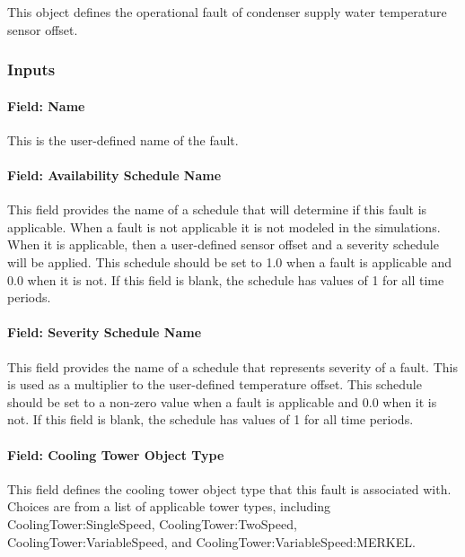 This object defines the operational fault of condenser supply water temperature sensor offset.

\subsubsection{Inputs}

\paragraph{Field: Name}

This is the user-defined name of the fault.

\paragraph{Field: Availability Schedule Name}

This field provides the name of a schedule that will determine if this fault is applicable. When a fault is not applicable it is not modeled in the simulations. When it is applicable, then a user-defined sensor offset and a severity schedule will be applied. This schedule should be set to 1.0 when a fault is applicable and 0.0 when it is not. If this field is blank, the schedule has values of 1 for all time periods.

\paragraph{Field: Severity Schedule Name}\label{field-severity-schedule-name}

This field provides the name of a schedule that represents severity of a fault. This is used as a multiplier to the user-defined temperature offset. This schedule should be set to a non-zero value when a fault is applicable and 0.0 when it is not. If this field is blank, the schedule has values of 1 for all time periods.

\paragraph{Field: Cooling Tower Object Type}\label{field-tower-object-type}

This field defines the cooling tower object type that this fault is associated with. Choices are from a list of applicable tower types, including CoolingTower:SingleSpeed, CoolingTower:TwoSpeed, CoolingTower:VariableSpeed, and CoolingTower:VariableSpeed:MERKEL.


